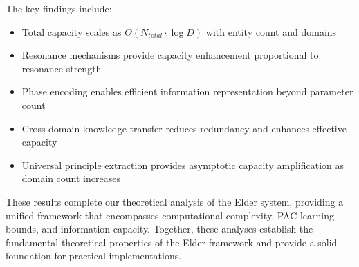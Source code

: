 The key findings include:
\begin{itemize}
    \item Total capacity scales as $\Theta(N_{total} \cdot \log D)$ with entity count and domains
    \item Resonance mechanisms provide capacity enhancement proportional to resonance strength
    \item Phase encoding enables efficient information representation beyond parameter count
    \item Cross-domain knowledge transfer reduces redundancy and enhances effective capacity
    \item Universal principle extraction provides asymptotic capacity amplification as domain count increases
\end{itemize}

These results complete our theoretical analysis of the Elder system, providing a unified framework that encompasses computational complexity, PAC-learning bounds, and information capacity. Together, these analyses establish the fundamental theoretical properties of the Elder framework and provide a solid foundation for practical implementations.